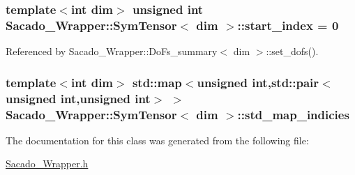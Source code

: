 \subsubsection[{\texorpdfstring{start\+\_\+index}{start_index}}]{\setlength{\rightskip}{0pt plus 5cm}template$<$int dim$>$ unsigned {\bf int} {\bf Sacado\+\_\+\+Wrapper\+::\+Sym\+Tensor}$<$ dim $>$\+::start\+\_\+index = 0}\hypertarget{classSacado__Wrapper_1_1SymTensor_afe921e6044e4110fcfc848c52844d650}{}\label{classSacado__Wrapper_1_1SymTensor_afe921e6044e4110fcfc848c52844d650}


Referenced by Sacado\+\_\+\+Wrapper\+::\+Do\+Fs\+\_\+summary$<$ dim $>$\+::set\+\_\+dofs().

\subsubsection[{\texorpdfstring{std\+\_\+map\+\_\+indicies}{std_map_indicies}}]{\setlength{\rightskip}{0pt plus 5cm}template$<$int dim$>$ std\+::map$<$unsigned {\bf int},std\+::pair$<$unsigned {\bf int},unsigned {\bf int}$>$ $>$ {\bf Sacado\+\_\+\+Wrapper\+::\+Sym\+Tensor}$<$ dim $>$\+::std\+\_\+map\+\_\+indicies}\hypertarget{classSacado__Wrapper_1_1SymTensor_ae3b1c56cde3fc5c7805b618ef3d9de75}{}\label{classSacado__Wrapper_1_1SymTensor_ae3b1c56cde3fc5c7805b618ef3d9de75}


The documentation for this class was generated from the following file\+:\begin{DoxyCompactItemize}
\item 
\hyperlink{Sacado__Wrapper_8h}{Sacado\+\_\+\+Wrapper.\+h}\end{DoxyCompactItemize}
